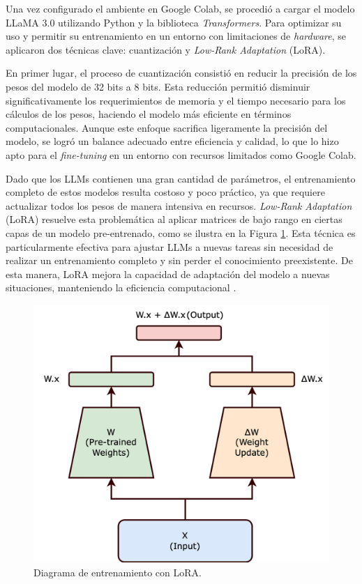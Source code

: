 Una vez configurado el ambiente en Google Colab, se procedió a cargar el modelo LLaMA 3.0 utilizando Python y la biblioteca \textit{Transformers}. Para optimizar su uso y permitir su entrenamiento en un entorno con limitaciones de \textit{hardware}, se aplicaron dos técnicas clave: cuantización y \textit{Low-Rank Adaptation} (LoRA).

En primer lugar, el proceso de cuantización consistió en reducir la precisión de los pesos del modelo de 32 bits a 8 bits. Esta reducción permitió disminuir significativamente los requerimientos de memoria y el tiempo necesario para los cálculos de los pesos, haciendo el modelo más eficiente en términos computacionales. Aunque este enfoque sacrifica ligeramente la precisión del modelo, se logró un balance adecuado entre eficiencia y calidad, lo que lo hizo apto para el \textit{fine-tuning} en un entorno con recursos limitados como Google Colab.

Dado que los LLMs contienen una gran cantidad de parámetros, el entrenamiento completo de estos modelos resulta costoso y poco práctico, ya que requiere actualizar todos los pesos de manera intensiva en recursos. \textit{Low-Rank Adaptation} (LoRA) resuelve esta problemática al aplicar matrices de bajo rango en ciertas capas de un modelo pre-entrenado, como se ilustra en la Figura \ref{fig:LORA}. Esta técnica es particularmente efectiva para ajustar LLMs a nuevas tareas sin necesidad de realizar un entrenamiento completo y sin perder el conocimiento preexistente. De esta manera, LoRA mejora la capacidad de adaptación del modelo a nuevas situaciones, manteniendo la eficiencia computacional \cite{Jawade2023}.

\begin{figure}[h] \begin{center} \includegraphics[height=5.5 cm]{plantilla/Lora.png} 
\caption{Diagrama de entrenamiento con LoRA.}
\label{fig:LORA} \end{center} \end{figure}

